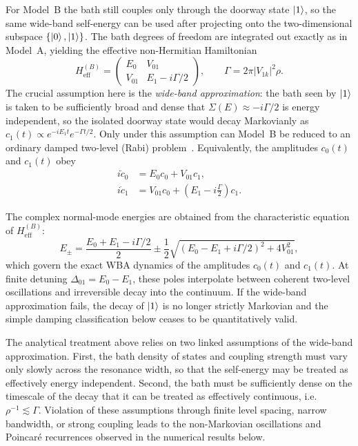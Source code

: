 \documentclass[aps,prx,reprint,showpacs,showkeys,floatfix]{revtex4-2}
\begin{document}
For Model~B the bath still couples only through the doorway state
$\ket{1}$, so the same wide-band self-energy can be used after projecting
onto the two-dimensional subspace $\{\ket{0},\ket{1}\}$.  The bath degrees
of freedom are integrated out exactly as in Model~A, yielding the effective
non-Hermitian Hamiltonian
\begin{equation}
    H_{\mathrm{eff}}^{(B)} =
    \begin{pmatrix}
        E_0 & V_{01} \\
        V_{01} & E_1 - i\Gamma/2
    \end{pmatrix},
    \qquad
    \Gamma = 2\pi |V_{1k}|^2\rho.
    \label{eq:HeffB}
\end{equation}
The crucial assumption here is the \emph{wide-band approximation}: the bath
seen by $\ket{1}$ is taken to be sufficiently broad and dense that
$\Sigma(E)\approx -i\Gamma/2$ is energy independent, so the isolated doorway
state would decay Markovianly as $c_1(t)\propto e^{-iE_1 t}e^{-\Gamma t/2}$.
Only under this assumption can Model~B be reduced to an ordinary damped
two-level (Rabi) problem~\cite{CohenTannoudji1997}.  Equivalently, the amplitudes
$c_0(t)$ and $c_1(t)$ obey
\begin{align}
    i\dot{c}_0 &= E_0 c_0 + V_{01}c_1, \\
    i\dot{c}_1 &= V_{01}c_0 + \left(E_1 - i\frac{\Gamma}{2}\right)c_1.
    \label{eq:modelB_WBA_amp}
\end{align}

The complex normal-mode energies are obtained from the characteristic
equation of $H_{\mathrm{eff}}^{(B)}$:
\begin{equation}
    E_{\pm} =
    \frac{E_0 + E_1 - i\Gamma/2}{2}
    \pm
    \frac{1}{2}\sqrt{\left(E_0-E_1+i\Gamma/2\right)^2 + 4V_{01}^2},
    \label{eq:EpmB}
\end{equation}
which govern the exact WBA dynamics of the amplitudes $c_0(t)$ and $c_1(t)$.
At finite detuning $\Delta_{01}=E_0-E_1$, these poles interpolate between
coherent two-level oscillations and irreversible decay into the continuum.
If the wide-band approximation fails, the decay of $\ket{1}$ is no longer
strictly Markovian and the simple damping classification below ceases to be
quantitatively valid.

The analytical treatment above relies on two linked assumptions of the
wide-band approximation.  First, the bath density of states and coupling
strength must vary only slowly across the resonance width, so that the
self-energy may be treated as effectively energy independent.  Second, the
bath must be sufficiently dense on the timescale of the decay that it can
be treated as effectively continuous, i.e.\ $\rho^{-1}\lesssim\Gamma$.
Violation of these assumptions through finite level spacing, narrow
bandwidth, or strong coupling leads to the non-Markovian oscillations and
Poincar\'e recurrences observed in the numerical results below.
\end{document}
